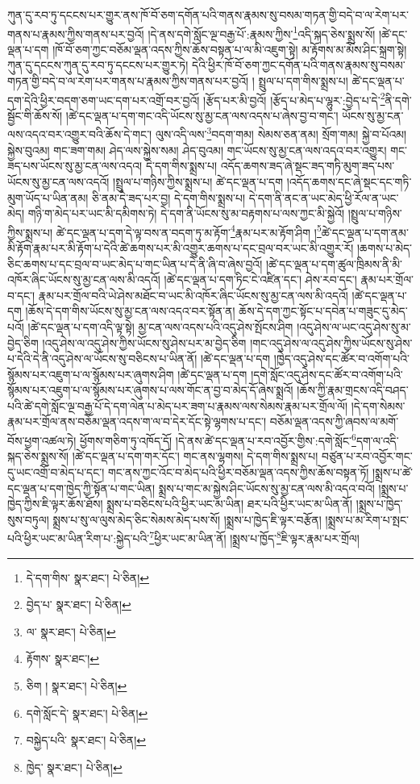 ཀུན་དུ་རབ་ཏུ་དངངས་པར་གྱུར་ནས་ཁོ་བོ་ཅག་དགོན་པའི་གནས་རྣམས་སུ་བསམ་གཏན་གྱི་བདེ་བ་ལ་རེག་པར་གནས་པ་རྣམས་ཀྱིས་གནས་པར་བྱའོ། །དེ་ནས་དགེ་སློང་ལྔ་བརྒྱ་པོ་:རྣམས་ཀྱིས་\footnote{དེ་དག་གིས་  སྣར་ཐང་།  པེ་ཅིན། }འདི་སྐད་ཅེས་སྨྲས་སོ། །ཚེ་དང་ལྡན་པ་དག །ཁོ་བོ་ཅག་ཀྱང་བཅོམ་ལྡན་འདས་ཀྱིས་ཆོས་བསྟན་པ་ལ་མི་འཇུག་སྟེ། མ་རྟོགས་མ་མོས་ཤིང་སྐྲག་སྟེ། ཀུན་དུ་དངངས་ཀུན་དུ་རབ་ཏུ་དངངས་པར་གྱུར་ཏེ། དེའི་ཕྱིར་ཁོ་བོ་ཅག་ཀྱང་དགོན་པའི་གནས་རྣམས་སུ་བསམ་གཏན་གྱི་བདེ་བ་ལ་རེག་པར་གནས་པ་རྣམས་ཀྱིས་གནས་པར་བྱའོ། །
སྤྲུལ་པ་དག་གིས་སྨྲས་པ། ཚེ་དང་ལྡན་པ་དག་དེའི་ཕྱིར་བདག་ཅག་ཡང་དག་པར་འགྲོ་བར་བྱའོ། །རྩོད་པར་མི་བྱའོ། །རྩོད་པ་མེད་པ་ལྷུར་:བྱེད་པ་དེ་\footnote{བྱེད་པ་  སྣར་ཐང་།  པེ་ཅིན། }ནི་དགེ་སྦྱོང་གི་ཆོས་སོ། །ཚེ་དང་ལྡན་པ་དག་གང་འདི་ཡོངས་སུ་མྱ་ངན་ལས་འདས་པ་ཞེས་བྱ་བ་གང་། ཡོངས་སུ་མྱ་ངན་ལས་འདའ་བར་འགྱུར་བའི་ཆོས་དེ་གང་། ལུས་འདི་ལས་\footnote{ལ་  སྣར་ཐང་།  པེ་ཅིན། }བདག་གམ། སེམས་ཅན་ནམ། སྲོག་གམ། སྐྱེ་བ་པོའམ། སྐྱེས་བུའམ། གང་ཟག་གམ། ཤེད་ལས་སྐྱེས་སམ། ཤེད་བུའམ། གང་ཡོངས་སུ་མྱ་ངན་ལས་འདའ་བར་འགྱུར། གང་ཟད་པས་ཡོངས་སུ་མྱ་ངན་ལས་འདའ། དེ་དག་གིས་སྨྲས་པ། འདོད་ཆགས་ཟད་ཞེ་སྡང་ཟད་གཏི་མུག་ཟད་པས་ཡོངས་སུ་མྱ་ངན་ལས་འདའོ། །སྤྲུལ་པ་གཉིས་ཀྱིས་སྨྲས་པ། ཚེ་དང་ལྡན་པ་དག །འདོད་ཆགས་དང་ཞེ་སྡང་དང་གཏི་མུག་ཡོད་པ་ཡིན་ནམ། ཅི་ནམ་དེ་ཟད་པར་བྱ། དེ་དག་གིས་སྨྲས་པ། དེ་དག་ནི་ནང་ན་ཡང་མེད་ཕྱི་རོལ་ན་ཡང་མེད། གཉི་ག་མེད་པར་ཡང་མི་དམིགས་ཏེ། དེ་དག་ནི་ཡོངས་སུ་མ་བརྟགས་པ་ལས་ཀྱང་མི་སྐྱེའོ། །སྤྲུལ་པ་གཉིས་ཀྱིས་སྨྲས་པ། ཚེ་དང་ལྡན་པ་དག་དེ་ལྟ་བས་ན་བདག་ཏུ་མ་རྟོག་\footnote{རྟོགས་  སྣར་ཐང་། }རྣམ་པར་མ་རྟོག་ཤིག །\footnote{ཅིག །  སྣར་ཐང་།  པེ་ཅིན། }ཚེ་དང་ལྡན་པ་དག་ནམ་མི་རྟོག་རྣམ་པར་མི་རྟོག་པ་དེའི་ཚེ་ཆགས་པར་མི་འགྱུར་ཆགས་པ་དང་བྲལ་བར་ཡང་མི་འགྱུར་རོ། །ཆགས་པ་མེད་ཅིང་ཆགས་པ་དང་བྲལ་བ་ཡང་མེད་པ་གང་ཡིན་པ་དེ་ནི་ཞི་བ་ཞེས་བྱའོ། །ཚེ་དང་ལྡན་པ་དག་ཚུལ་ཁྲིམས་ནི་མི་འཁོར་ཞིང་ཡོངས་སུ་མྱ་ངན་ལས་མི་འདའོ། །ཚེ་དང་ལྡན་པ་དག་ཏིང་ངེ་འཛིན་དང་། ཤེས་རབ་དང་། རྣམ་པར་གྲོལ་བ་དང་། རྣམ་པར་གྲོལ་བའི་ཡེ་ཤེས་མཐོང་བ་ཡང་མི་འཁོར་ཞིང་ཡོངས་སུ་མྱ་ངན་ལས་མི་འདའོ། །ཚེ་དང་ལྡན་པ་དག །ཆོས་དེ་དག་གིས་ཡོངས་སུ་མྱ་ངན་ལས་འདའ་བར་སྟོན་ན། ཆོས་དེ་དག་ཀྱང་སྟོང་པ་དབེན་པ་གཟུང་དུ་མེད་པའོ། །ཚེ་དང་ལྡན་པ་དག་འདི་ལྟ་སྟེ། མྱ་ངན་ལས་འདས་པའི་འདུ་ཤེས་སྤོངས་ཤིག །འདུ་ཤེས་ལ་ཡང་འདུ་ཤེས་སུ་མ་བྱེད་ཅིག །འདུ་ཤེས་ལ་འདུ་ཤེས་ཀྱིས་ཡོངས་སུ་ཤེས་པར་མ་བྱེད་ཅིག །གང་འདུ་ཤེས་ལ་འདུ་ཤེས་ཀྱིས་ཡོངས་སུ་ཤེས་པ་དེའི་དེ་ནི་འདུ་ཤེས་ལ་ཡོངས་སུ་བཅིངས་པ་ཡིན་ནོ། །ཚེ་དང་ལྡན་པ་དག །ཁྱེད་འདུ་ཤེས་དང་ཚོར་བ་འགོག་པའི་སྙོམས་པར་འཇུག་པ་ལ་སྙོམས་པར་ཞུགས་ཤིག །ཚེ་དང་ལྡན་པ་དག །དགེ་སློང་འདུ་ཤེས་དང་ཚོར་བ་འགོག་པའི་སྙོམས་པར་འཇུག་པ་ལ་སྙོམས་པར་ཞུགས་པ་ལས་གོང་ན་བྱ་བ་མེད་དོ་ཞེས་སྨྲའོ། །ཆོས་ཀྱི་རྣམ་གྲངས་འདི་བཤད་པའི་ཚེ་དགེ་སློང་ལྔ་བརྒྱ་པོ་དེ་དག་ལེན་པ་མེད་པར་ཟག་པ་རྣམས་ལས་སེམས་རྣམ་པར་གྲོལ་ལོ། །དེ་དག་སེམས་རྣམ་པར་གྲོལ་ནས་བཅོམ་ལྡན་འདས་ག་ལ་བ་དེར་དོང་སྟེ་ལྷགས་པ་དང་། བཅོམ་ལྡན་འདས་ཀྱི་ཞབས་ལ་མགོ་བོས་ཕྱག་འཚལ་ཏེ། ཕྱོགས་གཅིག་ཏུ་འཁོད་དོ། །དེ་ནས་ཚེ་དང་ལྡན་པ་རབ་འབྱོར་གྱིས་:དགེ་སློང་\footnote{དགེ་སློང་དེ་  སྣར་ཐང་།  པེ་ཅིན། }དག་ལ་འདི་སྐད་ཅེས་སྨྲས་སོ། །ཚེ་དང་ལྡན་པ་དག་གར་དོང་། གང་ནས་ལྷགས། དེ་དག་གིས་སྨྲས་པ། བཙུན་པ་རབ་འབྱོར་གང་དུ་ཡང་འགྲོ་བ་མེད་པ་དང་། གང་ནས་ཀྱང་འོང་བ་མེད་པའི་ཕྱིར་བཅོམ་ལྡན་འདས་ཀྱིས་ཆོས་བསྟན་ཏོ། །སྨྲས་པ་ཚེ་དང་ལྡན་པ་དག་ཁྱེད་ཀྱི་སྟོན་པ་གང་ཡིན། སྨྲས་པ་གང་མ་སྐྱེས་ཤིང་ཡོངས་སུ་མྱ་ངན་ལས་མི་འདའ་བའོ། །སྨྲས་པ་ཁྱེད་ཀྱིས་ཇི་ལྟར་ཆོས་ཐོས། སྨྲས་པ་བཅིངས་པའི་ཕྱིར་ཡང་མ་ཡིན། ཐར་པའི་ཕྱིར་ཡང་མ་ཡིན་ནོ། །སྨྲས་པ་ཁྱེད་སུས་བཏུལ། སྨྲས་པ་སུ་ལ་ལུས་མེད་ཅིང་སེམས་མེད་པས་སོ། །སྨྲས་པ་ཁྱེད་ཇི་ལྟར་བརྩོན། །སྨྲས་པ་མ་རིག་པ་སྤང་པའི་ཕྱིར་ཡང་མ་ཡིན་རིག་པ་:སྐྱེད་པའི་\footnote{བསྐྱེད་པའི་  སྣར་ཐང་།  པེ་ཅིན། }ཕྱིར་ཡང་མ་ཡིན་ནོ། །སྨྲས་པ་ཁྱོད་\footnote{ཁྱེད་  སྣར་ཐང་།  པེ་ཅིན། }ཇི་ལྟར་རྣམ་པར་གྲོལ། 